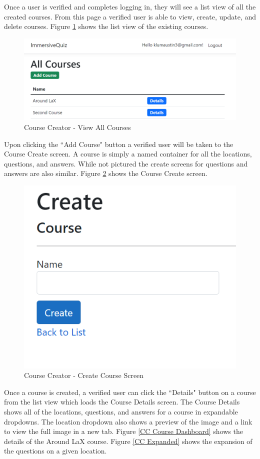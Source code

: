 Once a user is verified and completes logging in, they will see a list view of all the created courses. From this page a verified user is able to view, create, update, and delete courses. Figure \ref{CC All Courses} shows the list view of the existing courses. 
 \begin{figure}[htb]
 	\centering
 	\includegraphics[width=.5\textwidth]{Requirements/assets/cc-all-courses.png}
 	\caption[Course Creator - Veiw All Courses]{\label{CC All Courses}Course Creator - View All Courses}
 \end{figure}
Upon clicking the ``Add Course" button a verified user will be taken to the Course Create screen. A course is simply a named container for all the locations, questions, and answers. While not pictured the create screens for questions and answers are also similar. Figure \ref{CC Create Course} shows the Course Create screen.
\begin{figure}[htb]
	\centering
	\includegraphics[width=.5\textwidth]{Requirements/assets/cc-create-course.png}
	\caption[Course Creator - Create Course Screen]{\label{CC Create Course}Course Creator - Create Course Screen}
\end{figure}
Once a course is created, a verified user can click the ``Details" button on a course from the list view which loads the Course Details screen. The Course Details shows all of the locations, questions, and answers for a course in expandable dropdowns. The location dropdown also shows a preview of the image and a link to view the full image in a new tab. Figure \ref{CC Course Dashboard} shows the details of the Around LaX course. Figure \ref{CC Expanded} shows the expansion of the questions on a given location. 
